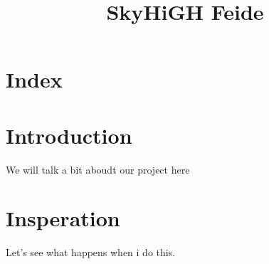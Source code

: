 \documentclass[12pt,a4paper]{article}
\begin{document}
\title{SkyHiGH Feide}
\maketitle 


\newpage
\section{Index}


\newpage
\section{Introduction}
We will talk a bit aboudt our project here

\section{Insperation}
Let's see what happens when i do this.
\end{document}
